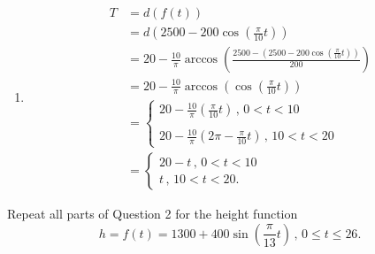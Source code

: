 \documentclass{ximera}
\begin{document}
\begin{question}
\begin{explanation}
\begin{enumerate}
\item 
\begin{align*}
    T &= d(f(t)) \\
       & = d\left( 2500 - 200 \cos \left(  \frac{\pi}{10}t  \right)  \right) \\
       &= 20 - \frac{10}{\pi} \arccos\left( \frac{2500 - \left(  2500 - 200 \cos \left(  \frac{\pi}{10}t \right)\right) }{200} \right) \\ 
       &=  20 - \frac{10}{\pi} \arccos\left( \cos \left(  \frac{\pi}{10}t \right) \right) \\
       &=\begin{cases}
               20 - \frac{10}{\pi}  \left( \frac{\pi}{10}t\right) \, , \, 0 <  t < 10 \\ \\
                20 - \frac{10}{\pi}  \left( 2\pi - \frac{\pi}{10}t\right) \, , \, 10 < t < 20
            \end{cases} \\
       &=\begin{cases}
               20 - t \, , \, 0 <  t < 10 \\
                t   \, , \, 10 < t < 20 .
            \end{cases}
\end{align*}
\end{enumerate}
\end{explanation}
\end{question}


\begin{question} \label{Qmfmf3zzzz}
Repeat all parts of Question 2 for the height function
\[
 h = f(t) = 1300 + 400\sin\left(  \frac{\pi}{13}t \right) \, , \, 0\leq t \leq 26.
\]
\end{question}




\end{document}

